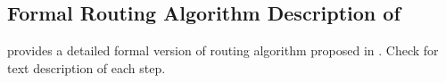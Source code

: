 




\subsection{Formal Routing Algorithm Description of \router}
\label{subsubsec:router-algo-blk}

 provides a detailed formal version of routing algorithm proposed in .
Check  for text description of each step.

